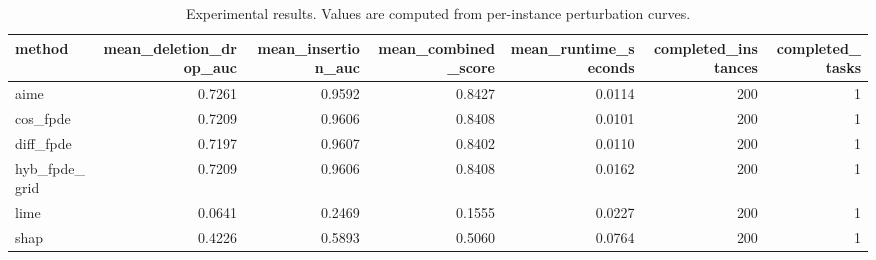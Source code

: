 \begin{table}[t]
\caption{Experimental results. Values are computed from per-instance perturbation curves.}
\label{tab:main_results_computed}
\centering
\begin{tabular}{lrrrrrr}
\toprule
method & mean\_deletion\_drop\_auc & mean\_insertion\_auc & mean\_combined\_score & mean\_runtime\_seconds & completed\_instances & completed\_tasks \\
\midrule
aime & 0.7261 & 0.9592 & 0.8427 & 0.0114 & 200 & 1 \\
cos\_fpde & 0.7209 & 0.9606 & 0.8408 & 0.0101 & 200 & 1 \\
diff\_fpde & 0.7197 & 0.9607 & 0.8402 & 0.0110 & 200 & 1 \\
hyb\_fpde\_grid & 0.7209 & 0.9606 & 0.8408 & 0.0162 & 200 & 1 \\
lime & 0.0641 & 0.2469 & 0.1555 & 0.0227 & 200 & 1 \\
shap & 0.4226 & 0.5893 & 0.5060 & 0.0764 & 200 & 1 \\
\bottomrule
\end{tabular}

\end{table}
